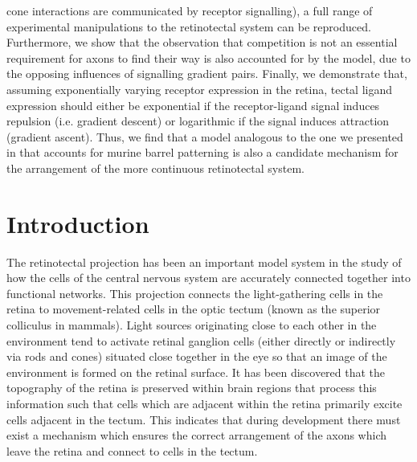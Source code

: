 \documentclass[11pt, a4paper]{article}
\begin{document}
{cone interactions are communicated by receptor signalling), a full range of
experimental manipulations to the retinotectal system can be
reproduced. Furthermore, we show that the observation that competition is not
an essential requirement for axons to find their
way \citep{gosse_retinotopic_2008} is also accounted for by the model, due to
the opposing influences of signalling gradient pairs. Finally, we demonstrate
that, assuming exponentially varying receptor expression in the retina, tectal
ligand expression should either be exponential if the receptor-ligand signal
induces repulsion (i.e. gradient descent) or logarithmic if the signal induces
attraction (gradient ascent). Thus, we find that a model analogous to the one
we presented in \citet{james_modelling_2020} that accounts for murine barrel
patterning is also a candidate mechanism for the arrangement of the more
continuous retinotectal system.}

\section{Introduction}

The retinotectal projection has been an important model system in the study of
how the cells of the central nervous system are accurately connected together
into functional networks. This projection connects the light-gathering cells
in the retina to movement-related cells in the optic tectum (known as the
superior colliculus in mammals). Light sources originating close to each other
in the environment tend to activate retinal ganglion cells (either
directly \cite{iRGC_citation} or indirectly via rods and cones) situated close
together in the eye so that an image of the environment is formed on the
retinal surface. It has been discovered that the topography of the retina is
preserved within brain regions that process this information such that cells
which are adjacent within the retina primarily excite cells adjacent in the
tectum. This indicates that during development there must exist a mechanism
which ensures the correct arrangement of the axons which leave the retina and
connect to cells in the tectum.
\end{document}
